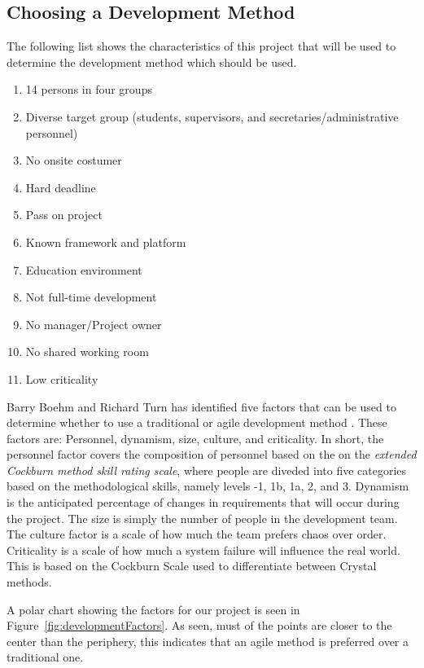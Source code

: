 \subsection{Choosing a Development Method}
The following list shows the characteristics of this project that will be used to determine the development method which should be used.
\begin{enumerate}
	\item 14 persons in four groups \label{enum:groupSize}
	\item Diverse target group (students, supervisors, and secretaries/administrative personnel) \label{enum:targetGroup}
	\item No onsite costumer \label{enum:onsite}
	\item Hard deadline \label{enum:deadline}
	\item Pass on project \label{enum:passed}
	\item Known framework and platform \label{enum:framework}
	\item Education environment \label{enum:education}
	\item Not full-time development \label{enum:halftime}
	\item No manager/Project owner \label{enum:manager}
	\item No shared working room \label{enum:room}
	\item Low criticality \label{enum:criticality}
\end{enumerate}
Barry Boehm and Richard Turn has identified five factors that can be used to determine whether to use a traditional or agile development method \cite{boehmTurner}.
These factors are: Personnel, dynamism, size, culture, and criticality.
In short, the personnel factor covers the composition of personnel based on the on the \textit{extended Cockburn method skill rating scale}, where people are diveded into five categories based on the methodological skills, namely levels -1, 1b, 1a, 2, and 3.
Dynamism is the anticipated percentage of changes in requirements that will occur during the project.
The size is simply the number of people in the development team.
The culture factor is a scale of how much the team prefers chaos over order.
Criticality is a scale of how much a system failure will influence the real world.
This is based on the Cockburn Scale used to differentiate between Crystal methods.

A polar chart showing the factors for our project is seen in Figure~\ref{fig:developmentFactors}.
As seen, must of the points are closer to the center than the periphery, this indicates that an agile method is preferred over a traditional one.

